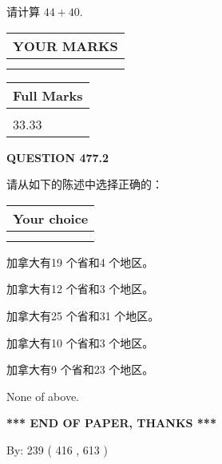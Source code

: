 \documentclass{ctexart}
\begin{document}
  
 
请计算 $ %
44 +  %
40 $.
 

 

 
  
\vspace{0.2in}
  
\noindent\begin{tabular}{|l|}
\hline
 YOUR MARKS  \\
\hline
 \\ 
 \\ 
\hline
\end{tabular}
\hspace{0.05in} \begin{tabular}{|l|}
\hline
 Full Marks  \\
\hline
 \\ 
33.33 \\
\hline
\end{tabular}
{\textbf{\Large{QUESTION
477.2 
}}}
  
  
请从如下的陈述中选择正确的：
  
  
\noindent\hspace{3.0in} \begin{tabular}{|l|}
\hline
Your choice \\
\hline
 \\ 
 \\ 
\hline
\end{tabular}
  
  
 
 
加拿大有19 个省和4 个地区。
 
 
加拿大有12 个省和3 个地区。
 
 
加拿大有25 个省和31 个地区。
 
 
加拿大有10 个省和3 个地区。
 
 
加拿大有9 个省和23 个地区。
 
 
 None of above.
 
 
   
   
 \vspace{0.2in}
 
   
   
   
   
\vspace{1.0in} 
{\textbf{\large{ *** END OF PAPER, THANKS *** }}} 
   
   
\hspace{1.0in} By: 
 239 ( 416 ,  613 )
   
\end{document}

